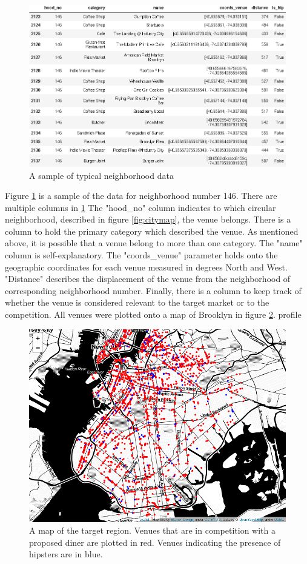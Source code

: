 \documentclass[12pt]{article}
\begin{document}
\begin{figure}[H]
  \includegraphics[width=6.5in]{hood146.png}
  \caption{A sample of typical neighborhood data}
  \label{fig:hood146}
\end{figure}

	Figure \ref{fig:hood146} is a sample of the data for neighborhood number 146.
	There are multiple columns in \ref{fig:hood146}
	The "hood\_no" column indicates to which circular neighborhood, described in figure \ref{fig:citymap}, the venue belongs.
	There is a column to hold the primary category which described the venue.
	As mentioned above, it is possible that a venue belong to more than one category.
	The "name" column is self-explanatory.
	The "coords\_venue" parameter holds onto the geographic coordinates for each venue measured in degrees North and West.
	"Distance" describes the displacement of the venue from the neighborhood of corresponding neighborhood number.
	Finally, there is a column to keep track of whether the venue is considered relevant to the target market or to the competition.
	All venues were plotted onto a map of Brooklyn in figure \ref{fig:venues_map}.
profile 
\begin{figure}[H]
  \includegraphics[width=6.5in]{venues_map.png}
  \caption{A map of the target region. Venues that are in competition with a proposed diner are plotted in red. Venues indicating the presence of hipsters are in blue.}
  \label{fig:venues_map}
\end{figure}
\end{document}
